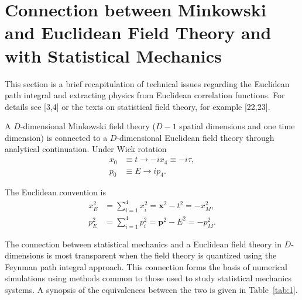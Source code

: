 \chapter{Connection between Minkowski and Euclidean Field Theory and with Statistical Mechanics}

This section is a brief recapitulation of technical issues regarding the Euclidean path integral and extracting physics from Euclidean correlation functions. For details see [3,4] or the texts on statistical field theory, for example [22,23].

A $D$-dimensional Minkowski field theory ($D-1$ spatial dimensions and one time dimension) is connected to a $D$-dimensional Euclidean field theory through analytical continuation. Under Wick rotation
\begin{equation}
\begin{aligned}
x_0 &\equiv t \to -i x_4 \equiv -i\tau , \\
p_0 &\equiv E \to i p_4 .
\end{aligned}
\label{eq:5.1}
\end{equation}

The Euclidean convention is
\begin{equation}
\begin{aligned}
x_E^2 &= \sum_{i=1}^{4} x_i^2 = \mathbf{x}^2 - t^2 = -x_M^2 , \\
p_E^2 &= \sum_{i=1}^{4} p_i^2 = \mathbf{p}^2 - E^2 = -p_M^2 .
\end{aligned}
\label{eq:5.2}
\end{equation}

The connection between statistical mechanics and a Euclidean field theory in $D$-dimensions is most transparent when the field theory is quantized using the Feynman path integral approach. This connection forms the basis of numerical simulations using methods common to those used to study statistical mechanics systems. A synopsis of the equivalences between the two is given in Table~\ref{tab:1}.

